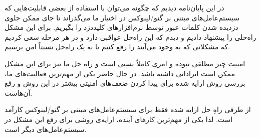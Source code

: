 
در این پایان‌نامه دیدیم که چگونه‌ می‌توان با استفاده از بعضی قابلیت‌هایی که سیستم‌عامل‌های مبتنی بر گنو/لینوکس در اختیار ما می‌گذراند تا جای ممکن جلوی دزدیده شدن کلمات عبور توسط نرم‌افزارهای کلید‌دزد را بگیریم. برای این مشکل راه‌حلی را پیشنهاد دادیم و دیدم که این راه‌حل عواقبی دارد و در هر مرحله سعی کردیم که مشکلاتی که به وجود می‌آیند را رفع کنیم تا به یک راه‌حل نسبتاً امن برسیم.



امنیت چیز مطلقی نبوده و امری کاملاً نسبی است و راه حل ما نیز برای این مشکل ممکن است ایراداتی داشته باشد. در حال حاضر یکی از مهم‌ترین فعالیت‌های ما، بررسی روش ارایه شده برای پیدا کردن ضعف‌های امنیتی بیشتر در این روش و رفع آن‌هاست.

از طرفی راهِ حل‌ ارایه شده فقط برای سیستم‌عامل‌های مبتنی بر گنو/لینوکس کارآمد است. لذا یکی از مهم‌ترین کار‌های آینده، ارایه‌ی روشی برای رفع این مشکل در سیستم‌عامل‌های دیگر است.